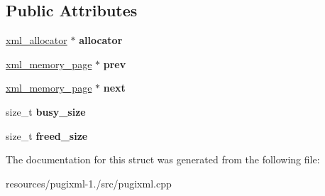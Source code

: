 \subsection*{Public Attributes}
\begin{DoxyCompactItemize}
\item 
\hypertarget{structxml__memory__page_adf8fa143123a842baa59b82fc3d83c3b}{\hyperlink{structxml__allocator}{xml\+\_\+allocator} $\ast$ {\bfseries allocator}}\label{structxml__memory__page_adf8fa143123a842baa59b82fc3d83c3b}

\item 
\hypertarget{structxml__memory__page_a014969b0e4a34a6cb24e9823791e60ab}{\hyperlink{structxml__memory__page}{xml\+\_\+memory\+\_\+page} $\ast$ {\bfseries prev}}\label{structxml__memory__page_a014969b0e4a34a6cb24e9823791e60ab}

\item 
\hypertarget{structxml__memory__page_a326a74e009af80219ea31bc65ed9e45e}{\hyperlink{structxml__memory__page}{xml\+\_\+memory\+\_\+page} $\ast$ {\bfseries next}}\label{structxml__memory__page_a326a74e009af80219ea31bc65ed9e45e}

\item 
\hypertarget{structxml__memory__page_a04780ddabc14b45baba3d1ded79d355a}{size\+\_\+t {\bfseries busy\+\_\+size}}\label{structxml__memory__page_a04780ddabc14b45baba3d1ded79d355a}

\item 
\hypertarget{structxml__memory__page_ab4c29645546530a0e1938b53979890a8}{size\+\_\+t {\bfseries freed\+\_\+size}}\label{structxml__memory__page_ab4c29645546530a0e1938b53979890a8}

\end{DoxyCompactItemize}


The documentation for this struct was generated from the following file\+:\begin{DoxyCompactItemize}
\item 
resources/pugixml-\/1./src/pugixml.\+cpp\end{DoxyCompactItemize}
